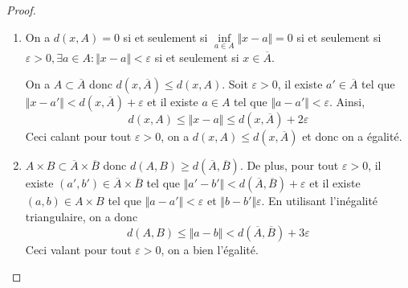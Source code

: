 \begin{proof}
	\phantom{}
	\begin{enumerate}
		\item On a $d(x,A)=0$ si et seulement si $\inf\limits_{a\in A}\Vert x-a\Vert=0$ si et seulement si $\varepsilon>0,\exists a\in A\colon\Vert x-a\Vert<\varepsilon$ si et seulement si $x\in\overline{A}$.

		On a $A\subset\overline{A}$ donc $d(x,\overline{A})\leqslant d(x,A)$. Soit $\varepsilon>0$, il existe $a'\in \overline{A}$ tel que $\Vert x-a'\Vert<d(x,\overline{A})+\varepsilon$ et il existe $a\in A$ tel que $\Vert a-a'\Vert<\varepsilon$. Ainsi, 
		\begin{equation}d(x,A)\leqslant\Vert x-a\Vert\leqslant d(x,\overline{A})+2\varepsilon\end{equation}
		Ceci calant pour tout $\varepsilon>0$, on a $d(x,A)\leqslant d(x,\overline{A})$ et donc on a égalité.

		\item $A\times B\subset\overline{A}\times\overline{B}$ donc $d(A,B)\geqslant d(\overline{A},\overline{B})$. De plus, pour tout $\varepsilon>0$, il existe $(a',b')\in\overline{A}\times\overline{B}$ tel que $\Vert a'-b'\Vert<d(\overline{A},\overline{B})+\varepsilon$ et il existe $(a,b)\in A\times B$ tel que $\Vert a-a'\Vert<\varepsilon$ et $\Vert b-b'\Vert\varepsilon$. En utilisant l'inégalité triangulaire, on a donc 
		\begin{equation}d(A,B)\leqslant\Vert a-b\Vert<d(\overline{A},\overline{B})+3\varepsilon\end{equation}
		Ceci valant pour tout $\varepsilon>0$, on a bien l'égalité.
	\end{enumerate}
\end{proof}

